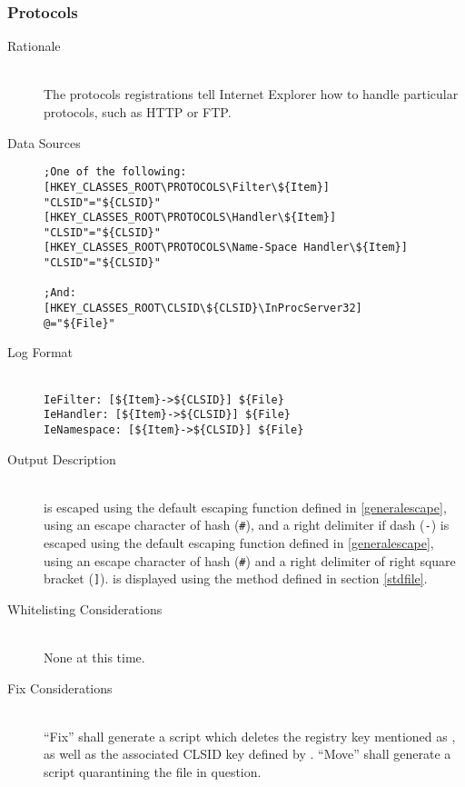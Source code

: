 \subsubsection{Protocols}
\begin{description}
\item[Rationale] \hfill \\
The protocols registrations tell Internet Explorer how to handle particular
protocols, such as HTTP or FTP.
\item[Data Sources] \hfill
\vspace{-\baselineskip}
\begin{verbatim}
;One of the following:
[HKEY_CLASSES_ROOT\PROTOCOLS\Filter\${Item}]
"CLSID"="${CLSID}"
[HKEY_CLASSES_ROOT\PROTOCOLS\Handler\${Item}]
"CLSID"="${CLSID}"
[HKEY_CLASSES_ROOT\PROTOCOLS\Name-Space Handler\${Item}]
"CLSID"="${CLSID}"

;And:
[HKEY_CLASSES_ROOT\CLSID\${CLSID}\InProcServer32]
@="${File}"
\end{verbatim}
\item[Log Format] \hfill \\
\verb|IeFilter: [${Item}->${CLSID}] ${File}| \\
\verb|IeHandler: [${Item}->${CLSID}] ${File}| \\
\verb|IeNamespace: [${Item}->${CLSID}] ${File}|
\item[Output Description] \hfill \\
 is escaped using the default escaping function defined in
\ref{generalescape}, using an escape character of hash (\verb|#|), and a right
delimiter if dash (\verb|-|)  is escaped using the default escaping
function defined in \ref{generalescape}, using an escape character of hash
(\verb|#|) and a right delimiter of right square bracket (\verb|]|).
 is displayed using the method defined in section \ref{stdfile}.
\item[Whitelisting Considerations] \hfill \\
None at this time.
\item[Fix Considerations] \hfill \\
``Fix'' shall generate a script which deletes the registry key mentioned as
, as well as the associated CLSID key defined by . ``Move''
shall generate a script quarantining the file in question.
\end{description}

